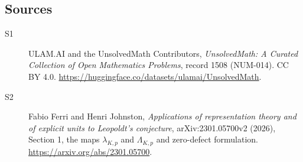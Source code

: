 \documentclass[11pt]{article}
\begin{document}
\subsection{Sources}
\begin{description}
\item[\hypertarget{source:1508:1}{S1}] ULAM.AI and the UnsolvedMath Contributors, \emph{UnsolvedMath: A Curated Collection of Open Mathematics Problems}, record 1508 (NUM-014). CC BY 4.0. \url{https://huggingface.co/datasets/ulamai/UnsolvedMath}.
\item[\hypertarget{source:1508:2}{S2}] Fabio Ferri and Henri Johnston, \emph{Applications of representation theory and of explicit units to Leopoldt's conjecture}, arXiv:2301.05700v2 (2026), Section 1, the maps $\lambda_{K,p}$ and $\Lambda_{K,p}$ and zero-defect formulation. \url{https://arxiv.org/abs/2301.05700}.
\end{description}
\label{end:1508}
\end{document}
